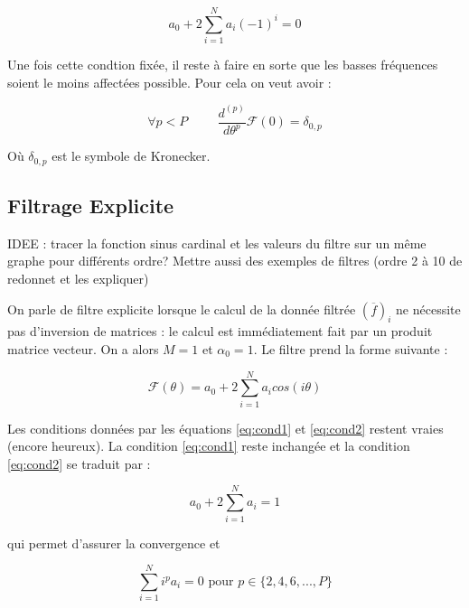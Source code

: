 \documentclass[10pt,a4paper]{amsart}
\begin{document}
\begin{equation}
  \label{eq:cond1}
  a_0 + 2 \sum_{i=1}^N a_i (-1)^i = 0
\end{equation}

Une fois cette condtion fixée, il reste à faire en sorte que les basses fréquences soient le moins affectées possible. Pour cela on veut avoir :

\begin{equation}
  \label{eq:cond2}
  \forall p < P \hspace{1cm} \dfrac{d^{(p)}}{d \theta^p} \mathcal{F} ( 0 ) = \delta_{0,p} 
\end{equation}

Où $\delta_{0,p}$ est le symbole de Kronecker. 

\subsection{Filtrage Explicite}

IDEE : tracer la fonction sinus cardinal et les valeurs du filtre sur un même graphe pour différents ordre? Mettre aussi des exemples de filtres (ordre 2 à 10 de redonnet et les expliquer)

On parle de filtre explicite lorsque le calcul de la donnée filtrée $(\overline{f})_i$ ne nécessite pas d'inversion de matrices : le calcul est immédiatement fait par un produit matrice vecteur. On a alors $M=1$ et $\alpha_0 = 1$. Le filtre prend la forme suivante :

\begin{equation}
  \label{eq:filtre_explicite}
  \mathcal{F}(\theta) = a_0 + 2 \sum_{i=1}^N a_i cos( i \theta )
\end{equation}  

Les conditions données par les équations \eqref{eq:cond1} et \eqref{eq:cond2} restent vraies (encore heureux). La condition \eqref{eq:cond1} reste inchangée et la condition \eqref{eq:cond2} se traduit par :

\begin{equation}
  \label{eq:explicite:cond1a}
  a_0 + 2 \sum_{i=1}^N a_i = 1
\end{equation}

qui permet d'assurer la convergence et

\begin{equation}
  \label{eq:explicite:con1b}
  \sum_{i=1}^N i^p a_i = 0 \text{ pour } p \in \{ 2, 4, 6, ..., P \}
\end{equation}
\end{document}
